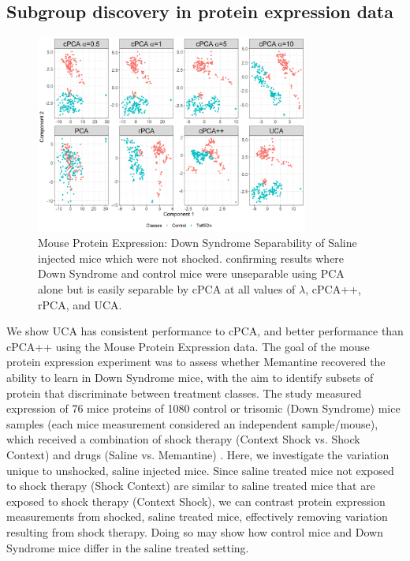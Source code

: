 \documentclass[12pt]{article}
\begin{document}
\subsection{Subgroup discovery in protein expression data}
\begin{figure}[th!]
    \centering
	\includegraphics[width = 0.8\textwidth]{figure/Mouse_Data.png}
	\caption{Mouse Protein Expression: Down Syndrome Separability of Saline injected mice which were not shocked. confirming  \cite{Abid} results where Down Syndrome and control mice were unseparable using PCA alone but is easily separable by cPCA at all values of $\lambda$, cPCA++, rPCA, and UCA.}
	\label{fig:Mouse}
\end{figure}
We show UCA has consistent performance to cPCA, and better performance than cPCA++ using the Mouse Protein Expression data.
The goal of the mouse protein expression experiment was to assess whether Memantine recovered the ability to learn in Down Syndrome mice, with the aim to identify subsets of protein that discriminate between treatment classes.
 The study measured expression of 76 mice proteins of 1080 control or trisomic (Down Syndrome) mice samples (each mice measurement considered an independent sample/mouse), which received a combination of shock therapy (Context Shock vs. Shock Context) and drugs (Saline vs. Memantine)  \cite{Ahmed, Higuera, Abid}.  
Here, we investigate the variation unique to unshocked, saline injected mice.
Since saline treated mice not exposed to shock therapy (Shock Context) are similar to saline treated mice that are exposed to shock therapy (Context Shock), we can contrast protein expression measurements from shocked, saline treated mice, effectively removing variation resulting from shock therapy. Doing so may show how control mice and Down Syndrome mice differ in the saline treated setting.
\end{document}
